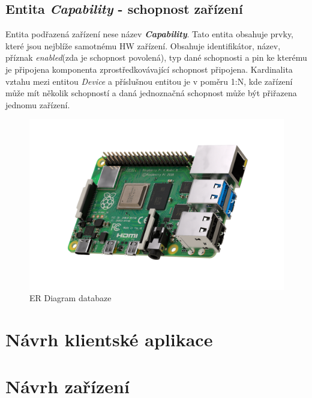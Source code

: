 \subsection*{Entita \emph{Capability} - schopnost zařízení}
\label{databaze:capability}
Entita podřazená zařízení nese název \textbf{\emph{Capability}}. Tato entita obsahuje prvky, které jsou nejblíže samotnému HW zařízení.
Obsahuje identifikátor, název, příznak \emph{enabled}(zda je schopnost povolená), typ dané schopnosti a pin ke kterému je připojena komponenta zprostředkovávající schopnost připojena.
Kardinalita vztahu mezi entitou \emph{Device} a příslušnou entitou je v poměru 1:N, kde zařízení může mít několik schopností a daná jednoznačná schopnost může být přiřazena jednomu zařízení.

\begin{figure}[hbt]
  \centering
  \includegraphics[width=1 \linewidth]{obrazky-figures/raspberry.png}
  \caption{ER Diagram databaze}
  \label{figure:er_databaze}
\end{figure}

\newpage
\section{Návrh klientské aplikace}
\label{navrh:frontend}

\section{Návrh zařízení}
\label{navrh:hardware}

